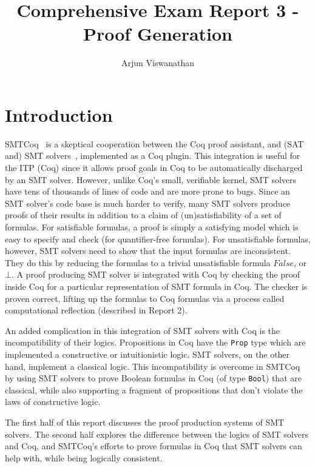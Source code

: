 \documentclass{article}
\begin{document}
\title{Comprehensive Exam Report 3 - Proof Generation}
\author{Arjun Viswanathan}
\date{}
\maketitle

\section{Introduction}
\label{sec:intro}
	SMTCoq~\cite{DBLP:phd/hal/Keller13} 
	is a skeptical cooperation 
	between the Coq proof assistant, and 
	(SAT and) SMT solvers~\cite{Barrett2018}, 
	implemented as a 
	Coq plugin. This integration is 
	useful for the ITP (Coq) since it 
	allows proof goals in Coq to be 
	automatically discharged by an 
	SMT solver. However, unlike 
	Coq's small, verifiable kernel,
	SMT solvers have tens of thousands 
	of lines of code and are more prone
	to bugs. Since an SMT solver's code 
	base is much harder to verify, 
	many SMT solvers produce proofs
	of their results in addition to 
	a claim of (un)satisfiability
	of a set of formulas. For satisfiable 
	formulas, a proof is simply a
	satisfying model which is easy 
	to specify and check (for 
	quantifier-free formulas). For 
	unsatisfiable formulas, however,
	SMT solvers need to show that 
	the input formulas are inconsistent.
	They do this by reducing the formulas 
	to a trivial unsatisfiable formula
	$False$, or $\bot$. A proof 
	producing SMT solver is integrated 
	with Coq by checking the proof 
	inside Coq for a particular 
	representation of SMT formula in 
	Coq. The checker is proven correct,
	lifting up the formulas
	to Coq formulas via a
	process called computational 
	reflection (described in Report 2).
	
	An added complication in this 
	integration of SMT solvers with 
	Coq is the incompatibility of 
	their logics. Propositions in 
	Coq have the 
	\texttt{Prop} type which are 
	implemented a constructive
	or intuitionistic logic. SMT
	solvers, on the other hand, 
	implement a classical logic. This
	incompatibility is overcome in 
	SMTCoq by using SMT solvers to 
	prove Boolean formulas in 
	Coq (of type \texttt{Bool})
	that are classical, while also 
	supporting a fragment of 
	propositions that don't violate 
	the laws of constructive logic.
	
	The first half of this report 
	discusses the proof production 
	systems of SMT solvers. The
	second half explores the difference
	between the logics of SMT solvers
	and Coq, and SMTCoq's efforts 
	to prove formulas in Coq that 
	SMT solvers can help with,
	while being logically consistent.
\end{document}
